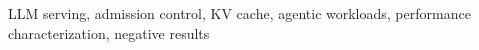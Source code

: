 \documentclass[10pt,conference]{IEEEtran}
\begin{document}
\begin{IEEEkeywords}
LLM serving, admission control, KV cache, agentic workloads, performance
characterization, negative results
\end{IEEEkeywords}












\end{document}

